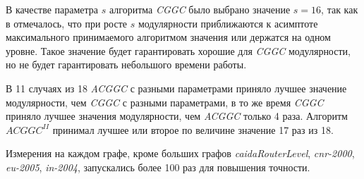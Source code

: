 В качестве параметра $s$ алгоритма \emph{CGGC} было выбрано значение $s = 16$, так как в \cite{Ovelgoenne&Geyer-Schulz:2012b} отмечалось, что при росте $s$ модулярности приближаются к асимптоте максимального принимаемого алгоритмом значения или держатся на одном уровне. Такое значение будет гарантировать хорошие для \emph{CGGC} модулярности, но не будет гарантировать небольшого времени работы.

В 11 случаях из 18 \emph{ACGGC} с разными параметрами приняло лучшее значение модулярности, чем \emph{CGGC} с разными параметрами, в то же время \emph{CGGC} приняло лучшее значения модулярности, чем \emph{ACGGC} только 4 раза. Алгоритм $ACGGC^{II}$ принимал лучшее или второе по величине значение 17 раз из 18.

Измерения на каждом графе, кроме больших графов \emph{caidaRouterLevel}, \emph{cnr-2000}, \emph{eu-2005}, \emph{in-2004}, запускались более 100 раз для повышения точности.

